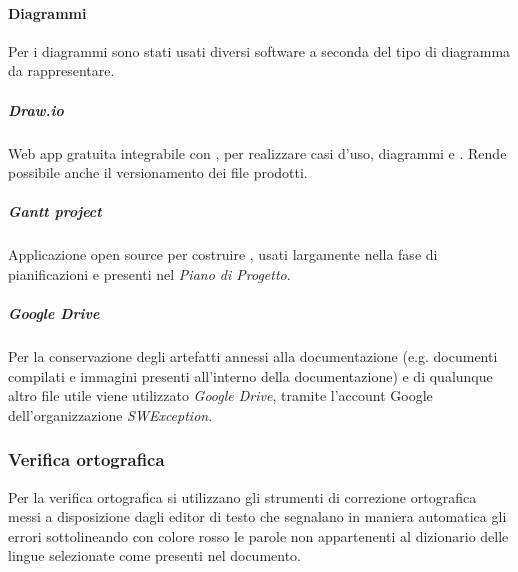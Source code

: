 \paragraph{Diagrammi}
Per i diagrammi sono stati usati diversi software a seconda del tipo di diagramma da rappresentare.
\subparagraph{\textit{Draw.io}}
Web app gratuita integrabile con , per realizzare casi d'uso, diagrammi e . Rende possibile anche il versionamento dei file prodotti.
\subparagraph{\textit{Gantt project}}
Applicazione open source per costruire , usati largamente nella fase di pianificazioni e presenti nel \textit{Piano di Progetto}.
\subparagraph{\textit{Google Drive}}
Per la conservazione degli artefatti annessi alla documentazione (e.g. documenti compilati e immagini presenti all'interno della documentazione) e di qualunque altro file utile viene utilizzato \textit{Google Drive}, tramite l'account Google dell'organizzazione \textit{SWException}. 

\subsubsection{Verifica ortografica}
Per la verifica ortografica si utilizzano gli strumenti di correzione ortografica messi a disposizione dagli editor di testo che segnalano in maniera automatica gli errori sottolineando con colore rosso le parole non appartenenti al dizionario delle lingue selezionate come presenti nel documento.
